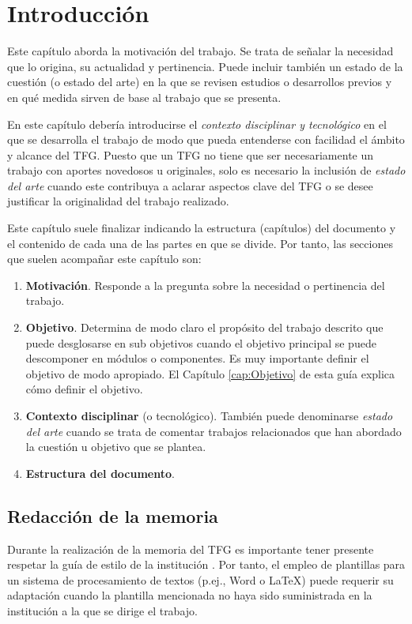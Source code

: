 \chapter{Introducción}
\label{cap:Introduccion}

Este capítulo aborda la motivación del trabajo. Se trata de señalar la necesidad que lo origina, su actualidad y pertinencia. Puede incluir también un estado de la cuestión (o estado del arte) en la que se revisen estudios o desarrollos previos y en qué medida sirven de base al trabajo que se presenta.

En este capítulo debería introducirse el \emph{contexto disciplinar y tecnológico} en el que se desarrolla el trabajo de modo que pueda entenderse con facilidad el ámbito y alcance del TFG. Puesto que un TFG no tiene que ser necesariamente un trabajo con aportes novedosos u originales, solo es necesario la inclusión de \emph{estado del arte} cuando este contribuya a aclarar aspectos clave del TFG o se desee justificar la originalidad del trabajo realizado.

Este capítulo suele finalizar indicando la estructura (capítulos) del documento y el contenido de cada una de las partes en que se divide. Por tanto, las secciones que suelen acompañar este capítulo son:
\begin{enumerate}
    \item \textbf{Motivación}. Responde a la pregunta sobre la necesidad o pertinencia del trabajo.
    \item \textbf{Objetivo}. Determina de modo claro el propósito del trabajo descrito que puede desglosarse en sub objetivos cuando el objetivo principal se puede descomponer en módulos o componentes. Es muy importante definir el objetivo de modo apropiado. El Capítulo \ref{cap:Objetivo} de esta guía explica cómo definir el objetivo.
    \item \textbf{Contexto disciplinar} (o tecnológico). También puede denominarse \emph{estado del arte} cuando se trata de comentar trabajos relacionados que han abordado la cuestión u objetivo que se plantea.
    \item \textbf{Estructura del documento}.
\end{enumerate}


\section{Redacción de la memoria}
Durante la realización de la memoria del TFG es importante tener presente respetar la guía de estilo de la institución \cite{esi19}. Por tanto, el empleo de plantillas para un sistema de procesamiento de textos (p.ej., Word o \LaTeX) puede requerir su adaptación cuando la plantilla mencionada no haya sido suministrada en la institución a la que se dirige el trabajo.

